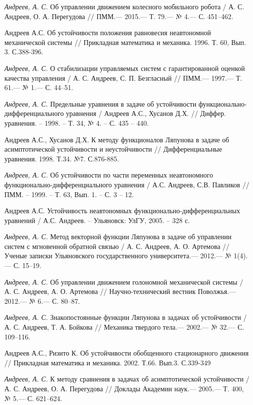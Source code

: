 \begin{thebibliography}{10}
	{\it Андреев, А. С.} Об управлении движением колесного мобильного робота /
	А. С. Андреев, О. А. Перегудова // ПММ.— 2015.— Т. 79.— № 4.— С. 451–462.
	
	 Андреев А.С. Об устойчивости положения равновесия неавтономной механической
	системы // Прикладная математика и механика. 1996. Т. 60, Вып. 3. С.388-396.
	
	{\it Андреев, А. С.} О стабилизации управляемых систем с гарантированной оценкой качества управления /
	А. С. Андреев, С. П. Безгласный // ПММ.— 1997.— Т. 61.— № 1.— С. 44–51.
	
	{\it Андреев, А. С.} Предельные уравнения в задаче об устойчивости функционально-дифференциального уравнения / Андреев А.С., Хусанов Д.Х. // Диффер. уравнения. – 1998. – Т. 34, № 4. – С. 435 – 440.
	
	Андреев А.С., Хусанов Д.Х. К методу функционалов Ляпунова в задаче об
	асимптотической устойчивости и неустойчивости // Дифференциальные уравнения. 1998. Т.34.
	№7. С.876-885.
	
	{\it Андреев, А. С.} Об устойчивости по части переменных неавтономного функционально-дифференциального уравнения / А.С. Андреев, С.В. Павликов // ПММ. – 1999. – Т. 63, Вып. 1. – С. 3 – 12.
	
	Андреев А.С. Устойчивость неавтономных функционально-дифференциальных уравнений / А.С. Андреев. – Ульяновск: УлГУ, 2005. – 328 с.
	
	{\it Андреев, А. С.} Метод векторной функции Ляпунова в задаче об управлении систем
	с мгновенной обратной связью / А. С. Андреев, А. О. Артемова // Ученые записки
	Ульяновского государственного университета.— 2012.— № 1(4).— С. 15–19.
	
	
	{\it Андреев, А. С.} Об управлении движением голономной механической системы / А. С. Андреев,
	А. О. Артемова // Научно-технический вестник Поволжья.— 2012.— № 6.— С. 80–87.
	
	{\it Андреев, А. С.} Знакопостоянные функции Ляпунова в задачах об устойчивости /
	А. С. Андреев, Т. А. Бойкова // Механика твердого тела.— 2002.— № 32.— С. 109–116.
	
	Андреев А.С., Ризито К. Об устойчивости обобщенного стационарного движения //
	Прикладная математика и механика. 2002. Т.66. Вып.3. С.339-349
	
	{\it Андреев, А. С.} К методу сравнения в задачах об асимптотической устойчивости /
	А. С. Андреев, О. А. Перегудова // Доклады Академии наук.— 2005.— Т. 400, № 5.—
	С. 621–624.
	

\end{thebibliography}
